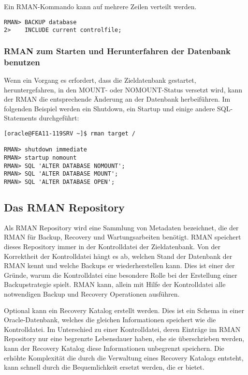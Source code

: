           Ein RMAN-Kommando kann auf mehrere Zeilen verteilt werden.
          \begin{lstlisting}[caption={Ein mehrzeiliges RMAN-Kommando},label=admin1004,language=rman]
RMAN> BACKUP database
2>    INCLUDE current controlfile;
          \end{lstlisting}
        \subsubsection{RMAN zum Starten und Herunterfahren der Datenbank benutzen}
          Wenn ein Vorgang es erfordert, dass die Zieldatenbank gestartet, heruntergefahren, in den MOUNT- oder NOMOUNT-Status versetzt wird, kann der RMAN die entsprechende \"Anderung an der Datenbank herbeif\"uhren. Im folgenden Beispiel werden ein Shutdown, ein Startup und einige andere SQL-Statements durchgef\"uhrt:
          \begin{lstlisting}[caption={Startup und Shutdown im RMAN},label=admin1005,language=rman,alsolanguage=sqlplus]
[oracle@FEA11-119SRV ~]$ rman target /

RMAN> shutdown immediate
RMAN> startup nomount
RMAN> SQL 'ALTER DATABASE NOMOUNT';
RMAN> SQL 'ALTER DATABASE MOUNT';
RMAN> SQL 'ALTER DATABASE OPEN';
        \end{lstlisting}
      \subsection{Das RMAN Repository}
        Als RMAN Repository wird eine Sammlung von Metadaten bezeichnet, die der RMAN f\"ur Backup, Recovery und Wartungsarbeiten ben\"otigt. RMAN speichert dieses Repository immer in der Kontrolldatei der Zieldatenbank. Von der Korrektheit der Kontrolldatei h\"angt es ab, welchen Stand der Datenbank der RMAN kennt und welche Backups er wiederherstellen kann. Dies ist einer der Gr\"unde, warum die Kontrolldatei eine besondere Rolle bei der Erstellung einer Backupstrategie spielt. RMAN kann, allein mit Hilfe der Kontrolldatei alle notwendigen Backup und Recovery Operationen ausf\"uhren.

        Optional kann ein Recovery Katalog erstellt werden. Dies ist ein Schema in einer Oracle-Datenbank, welches die gleichen Informationen speichert wie die Kontrolldatei. Im Unterschied zu einer Kontrolldatei, deren Eintr\"age im RMAN Repository nur eine begrenzte Lebensdauer haben, ehe sie \"uberschrieben werden, kann der Recovery Katalog diese Informationen unbegrenzt speichern. Die erh\"ohte Komplexit\"at die durch die Verwaltung eines Recovery Katalogs entsteht, kann schnell durch die Bequemlichkeit ersetzt werden, die er bietet.

